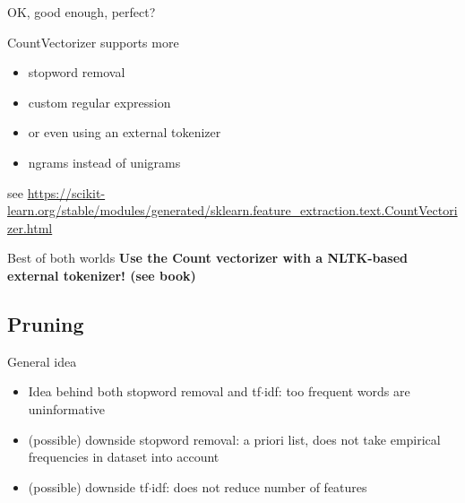 \documentclass[compress]{beamer}
\begin{document}
\begin{frame}{OK, good enough, perfect?}
\begin{block}{CountVectorizer supports more}
\begin{itemize}
\item stopword removal
\item custom regular expression
\item or even using an external tokenizer
\item ngrams instead of unigrams
\end{itemize}
\end{block}
\tiny{see \url{https://scikit-learn.org/stable/modules/generated/sklearn.feature\_extraction.text.CountVectorizer.html}}

\pause
\begin{alertblock}{Best of both worlds}
\textbf{Use the Count vectorizer with a NLTK-based external tokenizer! (see book)}
\end{alertblock}
\end{frame}


\subsection{Pruning}

\begin{frame}{General idea}
\begin{itemize}
	\item Idea behind both stopword removal and tf$\cdot$idf: too frequent words are uninformative
	\item<2-> (possible) downside stopword removal: a priori list, does not take empirical frequencies in dataset into account
	\item<3-> (possible) downside tf$\cdot$idf: does not reduce number of features
\end{itemize}

\end{frame}
\end{document}
